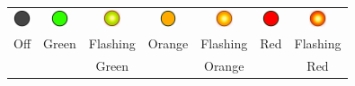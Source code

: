 \documentclass[12pt, a4paper]{report}
\begin{document}
\begin{tabular}{c c c c c c c}
	\includegraphics*[width=5mm]{off_led} & \includegraphics*[width=5mm]{green_led} & \includegraphics*[width=5mm]{green_led_flashing} & \includegraphics*[width=5mm]{orange_led} & \includegraphics*[width=5mm]{orange_led_flashing} & \includegraphics*[width=5mm]{red_led} & \includegraphics*[width=5mm]{red_led_flashing} \\
	Off & Green & Flashing & Orange & Flashing & Red & Flashing \\
	&& Green && Orange && Red \\

\end{tabular}
\end{document}
